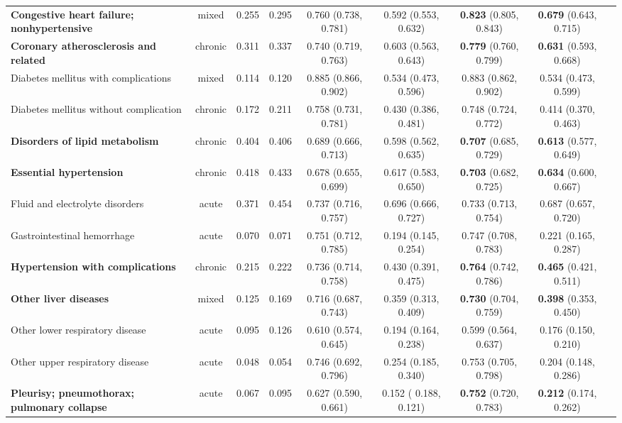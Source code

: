 \documentclass[pmlr]{jmlr}
\begin{document}
\begin{table*}[t!]
{\begin{tabular}{l c c c| c  c| c c c}
    \textbf{Congestive heart failure; nonhypertensive} & mixed &0.255 &0.295 & 0.760 (0.738, 0.781) & 0.592 (0.553, 0.632)  &\textbf{0.823} (0.805, 0.843) & \textbf{0.679} (0.643, 0.715) \\ 
    \textbf{Coronary atherosclerosis and related} & chronic & 0.311 &0.337 & 0.740 (0.719, 0.763) & 0.603 (0.563, 0.643) & \textbf{0.779} (0.760, 0.799) & \textbf{0.631} (0.593, 0.668)\\ 
    Diabetes mellitus with complications & mixed & 0.114 &0.120 & 0.885 (0.866, 0.902) & 0.534 (0.473, 0.596) &0.883 (0.862, 0.902) & 0.534 (0.473, 0.599)\\ 
    Diabetes mellitus without complication & chronic & 0.172 &0.211 & 0.758 (0.731, 0.781) & 0.430 (0.386, 0.481)  &0.748 (0.724, 0.772) & 0.414 (0.370, 0.463)\\ 
    \textbf{Disorders of lipid metabolism} & chronic & 0.404 &0.406 & 0.689 (0.666, 0.713) & 0.598 (0.562, 0.635)& \textbf{0.707} (0.685, 0.729) & \textbf{0.613} (0.577, 0.649) \\ 
    \textbf{Essential hypertension} & chronic & 0.418 &0.433 & 0.678 (0.655, 0.699) & 0.617 (0.583, 0.650) & \textbf{0.703} (0.682, 0.725) & \textbf{0.634} (0.600, 0.667) \\ 
    Fluid and electrolyte disorders & acute & 0.371 &0.454 & 0.737 (0.716, 0.757) & 0.696 (0.666, 0.727) & 0.733 (0.713, 0.754) & 0.687 (0.657, 0.720) \\ 
    Gastrointestinal hemorrhage & acute & 0.070 &0.071 &0.751 (0.712, 0.785) & 0.194 (0.145, 0.254)& 0.747 (0.708, 0.783) & 0.221 (0.165, 0.287) \\ 
    \textbf{Hypertension with complications} & chronic & 0.215 & 0.222 & 0.736 (0.714, 0.758) & 0.430 (0.391, 0.475)  & \textbf{0.764} (0.742, 0.786) & \textbf{0.465} (0.421, 0.511)\\ \textbf{Other liver diseases} & mixed &0.125 &0.169 & 0.716 (0.687, 0.743) & 0.359 (0.313, 0.409)   & \textbf{0.730} (0.704, 0.759) & \textbf{0.398} (0.353, 0.450)\\ 
    Other lower respiratory disease & acute & 0.095 &0.126 & 0.610 (0.574, 0.645) & 0.194 (0.164, 0.238)  &  0.599 (0.564, 0.637) & 0.176 (0.150, 0.210) \\ 
    Other upper respiratory disease & acute & 0.048 &0.054 & 0.746 (0.692, 0.796) & 0.254 (0.185, 0.340)  & 0.753 (0.705, 0.798) & 0.204 (0.148, 0.286)    \\ 
    \textbf{Pleurisy; pneumothorax; pulmonary collapse} & acute & 0.067 &0.095 & 0.627 (0.590, 0.661) & 0.152 ( 0.188, 0.121) & \textbf{0.752} (0.720, 0.783) & \textbf{0.212} (0.174, 0.262) \\ 

\end{tabular}}
\end{table*}
\end{document}
